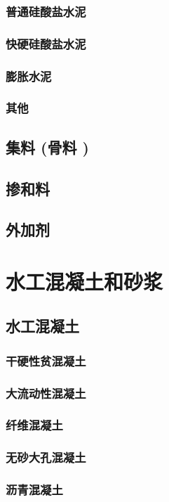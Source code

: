 \documentclass[UTF8]{../../ApplicationUniverse}
\begin{document}
        \subsubsection{普通硅酸盐水泥}
        \subsubsection{快硬硅酸盐水泥}
        \subsubsection{膨胀水泥}
        \subsubsection{其他}
    \subsection{集料 (骨料 )}
    \subsection{掺和料}
    \subsection{外加剂}
\section{水工混凝土和砂浆}
    \subsection{水工混凝土}
        \subsubsection{干硬性贫混凝土}
        \subsubsection{大流动性混凝土}
        \subsubsection{纤维混凝土}
        \subsubsection{无砂大孔混凝土}
        \subsubsection{沥青混凝土}
\end{document}
